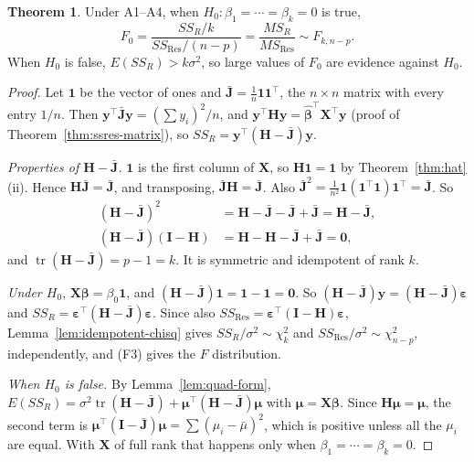 \documentclass[11pt,a4paper]{article}
\numberwithin{equation}{section}
\theoremstyle{definition}
\newtheorem{thm}{Theorem}[subsection]
\begin{document}
\begin{thm}\label{thm:overall-F}
Under A1--A4, when $H_0\colon \beta_1 = \cdots = \beta_k = 0$ is true,
\[
F_0 = \frac{SS_R/k}{SS_{\mathrm{Res}}/(n-p)} = \frac{MS_R}{MS_{\mathrm{Res}}} \sim F_{k, n-p} .
\]
When $H_0$ is false, $E(SS_R) > k\sigma^2$, so large values of $F_0$ are evidence against $H_0$.
\end{thm}

\begin{proof}
Let $\mathbf{1}$ be the vector of ones and $\bar{\mathbf{J}} = \frac1n\mathbf{1}\mathbf{1}^\top$,
the $n \times n$ matrix with every entry $1/n$. Then $\mathbf{y}^\top\bar{\mathbf{J}}\mathbf{y} = \left(\sum y_i\right)^2/n$,
and $\mathbf{y}^\top\mathbf{H}\mathbf{y} = \hat{\boldsymbol\beta}^\top\mathbf{X}^\top\mathbf{y}$
(proof of Theorem~\ref{thm:ssres-matrix}), so
$SS_R = \mathbf{y}^\top(\mathbf{H} - \bar{\mathbf{J}})\mathbf{y}$.

\emph{Properties of $\mathbf{H} - \bar{\mathbf{J}}$.} $\mathbf{1}$ is the first column of
$\mathbf{X}$, so $\mathbf{H}\mathbf{1} = \mathbf{1}$ by Theorem~\ref{thm:hat}(ii). Hence
$\mathbf{H}\bar{\mathbf{J}} = \bar{\mathbf{J}}$, and transposing, $\bar{\mathbf{J}}\mathbf{H} = \bar{\mathbf{J}}$.
Also $\bar{\mathbf{J}}^2 = \frac{1}{n^2}\mathbf{1}(\mathbf{1}^\top\mathbf{1})\mathbf{1}^\top = \bar{\mathbf{J}}$. So
\begin{align*}
(\mathbf{H} - \bar{\mathbf{J}})^2 &= \mathbf{H} - \bar{\mathbf{J}} - \bar{\mathbf{J}} + \bar{\mathbf{J}} = \mathbf{H} - \bar{\mathbf{J}}, \\
(\mathbf{H} - \bar{\mathbf{J}})(\mathbf{I} - \mathbf{H}) &= \mathbf{H} - \mathbf{H} - \bar{\mathbf{J}} + \bar{\mathbf{J}} = \mathbf{0},
\end{align*}
and $\operatorname{tr}(\mathbf{H} - \bar{\mathbf{J}}) = p - 1 = k$. It is symmetric and
idempotent of rank $k$.

\emph{Under $H_0$}, $\mathbf{X}\boldsymbol\beta = \beta_0\mathbf{1}$, and
$(\mathbf{H} - \bar{\mathbf{J}})\mathbf{1} = \mathbf{1} - \mathbf{1} = \mathbf{0}$. So
$(\mathbf{H} - \bar{\mathbf{J}})\mathbf{y} = (\mathbf{H} - \bar{\mathbf{J}})\boldsymbol\varepsilon$ and
$SS_R = \boldsymbol\varepsilon^\top(\mathbf{H} - \bar{\mathbf{J}})\boldsymbol\varepsilon$. Since also
$SS_{\mathrm{Res}} = \boldsymbol\varepsilon^\top(\mathbf{I} - \mathbf{H})\boldsymbol\varepsilon$,
Lemma~\ref{lem:idempotent-chisq} gives $SS_R/\sigma^2 \sim \chi^2_k$ and
$SS_{\mathrm{Res}}/\sigma^2 \sim \chi^2_{n-p}$, independently, and (F3) gives the $F$ distribution.

\emph{When $H_0$ is false.} By Lemma~\ref{lem:quad-form},
$E(SS_R) = \sigma^2\operatorname{tr}(\mathbf{H} - \bar{\mathbf{J}}) + \boldsymbol\mu^\top(\mathbf{H} - \bar{\mathbf{J}})\boldsymbol\mu$
with $\boldsymbol\mu = \mathbf{X}\boldsymbol\beta$. Since $\mathbf{H}\boldsymbol\mu = \boldsymbol\mu$,
the second term is $\boldsymbol\mu^\top(\mathbf{I} - \bar{\mathbf{J}})\boldsymbol\mu = \sum (\mu_i - \bar\mu)^2$,
which is positive unless all the $\mu_i$ are equal. With $\mathbf{X}$ of full rank that happens
only when $\beta_1 = \cdots = \beta_k = 0$.
\end{proof}
\end{document}

